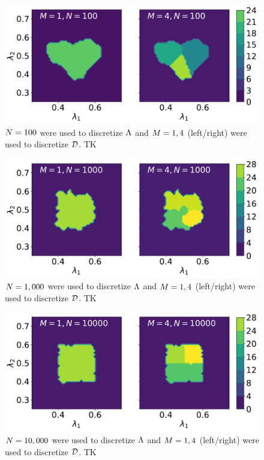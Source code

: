 \begin{figure}[ht]
\begin{minipage}{.975\textwidth}
  \includegraphics[width=\linewidth]{./examples/identity/set/M1-N100_N100-vs-M4-N100_N100.pdf}
\end{minipage}
\caption{
$N=100$ were used to discretize ${\Lambda}$ and $M=1, 4$ (left/right) were used to discretize $\mathcal{D}$.
TK
}
\label{fig:ex:identity_set_1E2}
\end{figure}

\begin{figure}[ht]
\begin{minipage}{.975\textwidth}
  \includegraphics[width=\linewidth]{./examples/identity/set/M1-N1000_N1000-vs-M4-N1000_N1000.pdf}
\end{minipage}
\caption{
$N=1,000$ were used to discretize ${\Lambda}$ and $M=1, 4$ (left/right) were used to discretize $\mathcal{D}$.
TK
}
\label{fig:ex:identity_set_1E3}
\end{figure}
\begin{figure}[ht]
\begin{minipage}{.975\textwidth}
  \includegraphics[width=\linewidth]{./examples/identity/set/M1-N10000_N10000-vs-M4-N10000_N10000.pdf}
\end{minipage}
\caption{
$N=10,000$ were used to discretize ${\Lambda}$ and $M=1, 4$ (left/right) were used to discretize $\mathcal{D}$.
TK
}
\label{fig:ex:identity_set_1E4}
\end{figure}
\FloatBarrier
